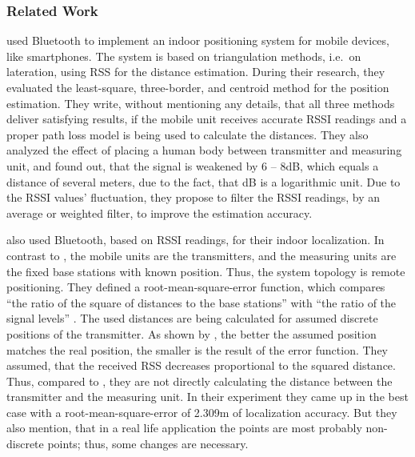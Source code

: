 \subsubsection*{Related Work}
\citet{wang:bt_pos} used Bluetooth to implement an indoor positioning system for mobile devices, like smartphones. The system is based on triangulation methods, i.e.\ on lateration, using \ac{RSS} for the distance estimation. During their research, they evaluated the least-square, three-border, and centroid method for the position estimation. They write, without mentioning any details, that all three methods deliver satisfying results, if the mobile unit receives accurate \ac{RSSI} readings and a proper path loss model is being used to calculate the distances. They also analyzed the effect of placing a human body between transmitter and measuring unit, and found out, that the signal is weakened by 6 -- 8dB, which equals a distance of several meters, due to the fact, that dB is a logarithmic unit. Due to the \ac{RSSI} values' fluctuation, they propose to filter the \ac{RSSI} readings, by an average or weighted filter, to improve the estimation accuracy.

\citet{oksar:bluetooth} also used Bluetooth, based on \ac{RSSI} readings, for their indoor localization. In contrast to \citet{wang:bt_pos}, the mobile units are the transmitters, and the measuring units are the fixed base stations with known position. Thus, the system topology is remote positioning. They defined a root-mean-square-error function, which compares ``the ratio of the square of distances to the base stations'' with ``the ratio of the signal levels'' \citep{oksar:bluetooth}. The used distances are being calculated for assumed discrete positions of the transmitter. As shown by \citet{oksar:bluetooth}, the better the assumed position matches the real position, the smaller is the result of the error function. They assumed, that the received \ac{RSS} decreases proportional to the squared distance. Thus, compared to \citet{wang:bt_pos}, they are not directly calculating the distance between the transmitter and the measuring unit. In their experiment they came up in the best case with a root-mean-square-error of 2.309m of localization accuracy. But they also mention, that in a real life application the points are most probably non-discrete points; thus, some changes are necessary.

